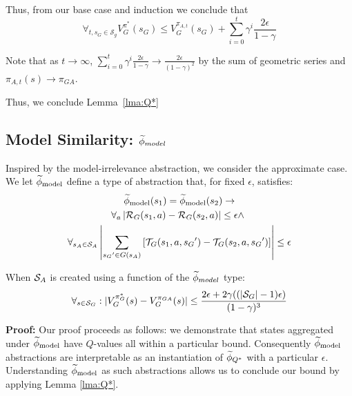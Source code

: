 Thus, from our base case and induction we conclude that
\begin{equation}
\forall_{t, s_G \in \mathcal{S}_g} V_G^{\pi^*}(s_G) \leq  V_G^{\pi_{A,t}}(s_G) + \sum_{i=0}^{t}\gamma^i \frac{2\epsilon}{1-\gamma}
\end{equation}

Note that as $t \rightarrow \infty$, $\sum_{i=0}^{t}\gamma^i \frac{2\epsilon}{1-\gamma} \rightarrow \frac{2\epsilon}{(1-\gamma)^2}$ by the sum of geometric series and $\pi_{A,t}(s) \rightarrow \pi_{GA}$.

Thus, we conclude Lemma~\ref{lma:Q*}

\subsection{Model Similarity: $\widetilde \phi_{model}$}
\label{sec:model}

Inspired by the model-irrelevance abstraction, we consider the approximate case. 
\bdefn{$\epM$}
We let $\epM$ define a type of abstraction that, for fixed $\epsilon$, satisfies:
\begin{multline}
\widetilde \phi_{\text{model}}(s_1) = \widetilde \phi_{\text{model}}(s_2) \rightarrow \\
\forall_a \left| \mathcal{R}_G(s_1, a) - \mathcal{R}_G(s_2, a)\right| \leq \epsilon \wedge\ \\
\forall_{s_A \in \mathcal{S}_A} \left|\sum_{{s_G}' \in G(s_A)} \left[\mathcal{T}_G(s_1, a, {s_G}') - \mathcal{T}_G(s_2, a,{s_G}')\right] \right| \leq \epsilon
\end{multline}
\edefn

\begin{lma}
\label{lma:model}
When $\mathcal{S}_A$ is created using a function of the $\widetilde \phi_{model}$ type:
\begin{equation}
\forall_{s \in \mathcal{S}_G} : | V_G^{\pi_G^*}(s) - V_G^{\pi_{GA}}(s) | \leq \frac{2\epsilon + 2\gamma((|\mathcal{S}_G|-1)\epsilon)}{(1-\gamma)^3}
\end{equation}
\end{lma}

{\bf Proof:} Our proof proceeds as follows: we demonstrate that states aggregated under $\epM$ have $Q$-values all within a particular bound. Consequently $\epM$ abstractions are interpretable as an instantiation of $\widetilde \phi_{Q^*}$ with a particular $\epsilon$. Understanding $\epM$ as such abstractions allows us to conclude our bound by applying Lemma \ref{lma:Q*}.


